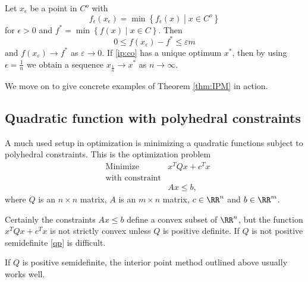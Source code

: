 \documentclass{article}
\begin{document}
\begin{theorem}[emph]\label{thm:IPM}
  Let $x_\epsilon$ be a point in $C^o$ with
  \begin{equation*}
    f_\epsilon(x_\epsilon) = \min\left\{ f_\epsilon(x) \middle| x\in C^o \right\}
  \end{equation*}
  for $\epsilon > 0$ and $f^* = \min\left\{ f(x) \middle| x\in C \right\}$.  Then
  \begin{equation*}
    0\leq f(x_\varepsilon) - f^* \leq \varepsilon m
  \end{equation*}
  and $f(x_\varepsilon)\to f^*$ as $\varepsilon \to 0$. If
  \eqref{ip:co} has a unique optimum $x^*$, 
then by using $\epsilon=\frac1n$ we obtain a sequence $x_{\frac{1}{n}}\to  x^*$ as $n\to \infty$.
 \end{theorem}

 We move on to give concrete examples of Theorem \ref{thm:IPM} in action.
 
 \subsection{Quadratic function with polyhedral constraints}

 A much used setup in optimization is minimizing a quadratic functions
 subject to polyhedral constraints. This is the optimization problem
\begin{align}\label{qp}
  &\text{Minimize} &x^T Q x + c^T x\\
  &\text{with constraint}\\
  &&A x \leq b,
\end{align}
where $Q$ is an $n\times n$ matrix, $A$ is an $m\times n$ matrix,  $c\in \RR^n$ and $b\in \RR^m$.

Certainly the constraints $A x\leq b$ define a convex subset of $\RR^n$, but the function
$x^T Q x + c^T x$ is not strictly convex unless $Q$ is positive definite. If $Q$ is not
positive semidefinite \eqref{qp} is difficult.

If $Q$ is positive semidefinite, the interior point method outlined above usually works well.
\end{document}
